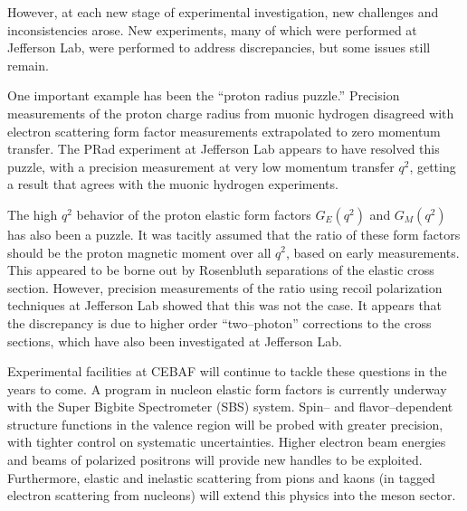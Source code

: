 However, at each new stage of experimental investigation, new challenges and inconsistencies arose. New experiments, many of which were performed at Jefferson Lab, were performed to address discrepancies, but some issues still remain.

One important example has been the ``proton radius puzzle.'' Precision measurements of the proton charge radius from muonic hydrogen disagreed with electron scattering form factor measurements extrapolated to zero momentum transfer. The PRad experiment at Jefferson Lab appears to have resolved this puzzle, with a precision measurement at very low momentum transfer $q^2$, getting a result that agrees with the muonic hydrogen experiments.

The high $q^2$ behavior of the proton elastic form factors $G_E(q^2)$ and $G_M(q^2)$ has also been a puzzle. It was tacitly assumed that the ratio of these form factors should be the proton magnetic moment over all $q^2$, based on early measurements. This appeared to be borne out by Rosenbluth separations of the elastic cross section. However, precision measurements of the ratio using recoil polarization techniques at Jefferson Lab showed that this was not the case. It appears that the discrepancy is due to higher order ``two--photon'' corrections to the cross sections, which have also been investigated at Jefferson Lab.

Experimental facilities at CEBAF will continue to tackle these questions in the years to come. A program in nucleon elastic form factors is currently underway with the Super Bigbite Spectrometer (SBS) system. Spin-- and flavor--dependent structure functions in the valence region will be probed with greater precision, with tighter control on systematic uncertainties. Higher electron beam energies and beams of polarized positrons will provide new handles to be exploited. Furthermore, elastic and inelastic scattering from pions and kaons (in tagged electron scattering from nucleons) will extend this physics into the meson sector.



